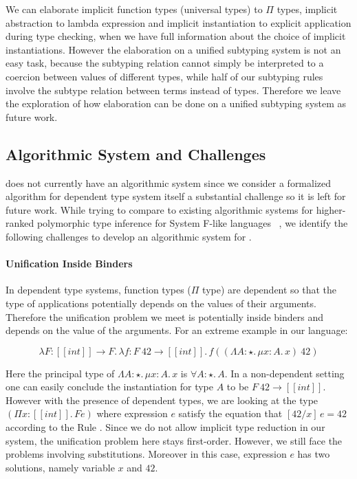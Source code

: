 We can elaborate implicit function types (universal types) to $\Pi$ types,
implicit abstraction to lambda expression and implicit instantiation to explicit
application during type checking, when we have full information about the
choice of implicit instantiations. However the elaboration on a unified subtyping
system is not an easy task, because the subtyping relation cannot simply be interpreted
to a coercion between values of different types, while half of our subtyping
rules involve the subtype relation between terms instead of types.
Therefore we leave the exploration of how elaboration can be done
on a unified subtyping system as future work.

\subsection{Algorithmic System and Challenges}

\name does not currently have an algorithmic system since we
consider a formalized algorithm for dependent type system itself a substantial challenge so it
is left for future work. While trying to compare to existing algorithmic systems
for higher-ranked polymorphic type inference for System F-like languages
~\cite{dunfield2013complete,zhao19mechanical},
we identify the following challenges to develop an algorithmic system for \name.

\paragraph{Unification Inside Binders}
In dependent type systems, function types ($\Pi$ type) are dependent so that
the type of applications potentially depends on the values of their arguments.
Therefore the unification problem we meet is potentially inside binders and
depends on the value of the arguments. For an extreme example in our language:

\begin{equation*}
    \lambda F : [[int]] \rightarrow F.\, \lambda f : F~42 \rightarrow [[int]].\, f ((\Lambda A : \star.\,\mu x : A.\, x)~42)
\end{equation*}

Here the principal type of $\Lambda A : \star.\,\mu x : A.\, x$ is $\forall A : \star.\, A$.
In a non-dependent setting one can easily conclude the instantiation for type $A$ to be
$F~42 \rightarrow [[int]]$. However with the presence of dependent types,
we are looking at the type $(\Pi x : [[int]].\, F e)$ where expression $e$
satisfy the equation that $[42/x]\,e = 42$ according to the Rule .
Since we do not allow implicit type reduction in our system,
the unification problem here stays first-order. However, we still face the
problems involving substitutions.
Moreover in this case, expression $e$ has two solutions, namely variable $x$
and $42$.

